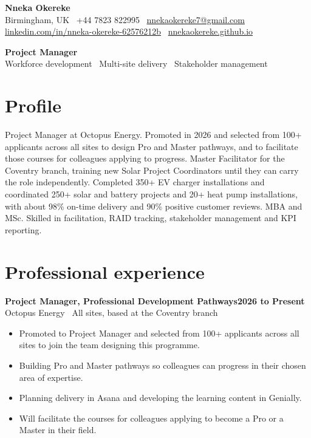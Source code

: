 \documentclass[10.5pt,a4paper]{article}
\newcommand{\role}[3]{%
  \vspace{0.45em}
  {\bfseries #1}\hfill{\bfseries #3}\\
  {\color{ink}#2}\par
  \vspace{0.1em}
}
\begin{document}
\color{ink}

{\LARGE\bfseries Nneka Okereke}\\[0.25em]
Birmingham, UK \textbar\ +44 7823 822995 \textbar\ \href{mailto:nnekaokereke7@gmail.com}{nnekaokereke7@gmail.com}\\
\href{https://www.linkedin.com/in/nneka-okereke-62576212b}{linkedin.com/in/nneka-okereke-62576212b} \textbar\ \href{https://nnekaokereke.github.io/}{nnekaokereke.github.io}

\vspace{0.35em}
{\large\bfseries Project Manager}\\
Workforce development \textbar\ Multi-site delivery \textbar\ Stakeholder management

\section*{Profile}
Project Manager at Octopus Energy. Promoted in 2026 and selected from 100+ applicants across all sites to design Pro and Master pathways, and to facilitate those courses for colleagues applying to progress. Master Facilitator for the Coventry branch, training new Solar Project Coordinators until they can carry the role independently. Completed 350+ EV charger installations and coordinated 250+ solar and battery projects and 20+ heat pump installations, with about 98\% on-time delivery and 90\% positive customer reviews. MBA and MSc. Skilled in facilitation, RAID tracking, stakeholder management and KPI reporting.

\section*{Professional experience}

\role{Project Manager, Professional Development Pathways}{Octopus Energy \textbar\ All sites, based at the Coventry branch}{2026 to Present}
\begin{itemize}
  \item Promoted to Project Manager and selected from 100+ applicants across all sites to join the team designing this programme.
  \item Building Pro and Master pathways so colleagues can progress in their chosen area of expertise.
  \item Planning delivery in Asana and developing the learning content in Genially.
  \item Will facilitate the courses for colleagues applying to become a Pro or a Master in their field.
\end{itemize}
\end{document}
